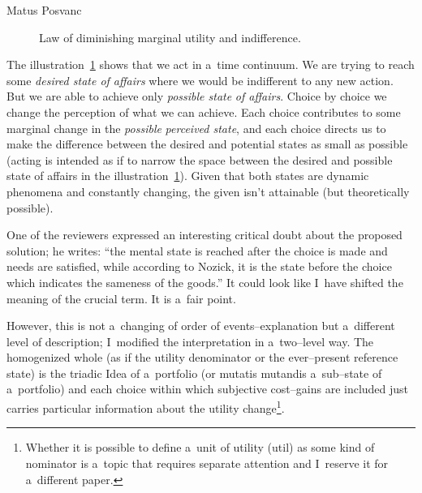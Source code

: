 \begin{artengenv}{Matus Posvanc}
\begin{figure}
 \begin{center}
 \end{center}%
 \caption{Law of diminishing marginal utility and indifference.}\label{pos:fig4}
\end{figure}






The illustration~\ref{pos:fig4} shows that we act in a~time continuum. We are trying to reach some \textit{desired state of affairs} where we would be indifferent to any new action. But we are able to achieve only \textit{possible state} \textit{of affairs}. Choice by choice we change the perception of what we can achieve. Each choice contributes to some marginal change in the \textit{possible} \textit{perceived state}, and each choice directs us to make the difference between the desired and potential states as small as possible (acting is intended as if to narrow the space between the desired and possible state of affairs in the illustration~\ref{pos:fig4}). Given that both states are dynamic phenomena and constantly changing, the given isn't attainable (but theoretically possible).



One of the reviewers expressed an interesting critical doubt about the proposed solution; he writes: ``the mental state is reached after the choice is made and needs are satisfied, while according to Nozick, it is the state before the choice which indicates the sameness of the goods.'' It could look like I~have shifted the meaning of the crucial term. It is a~fair point.



However, this is not a~changing of order of events–explanation but a~different level of description; I~modified the interpretation in a~two–level way. The homogenized whole (as if the utility denominator or the ever–present reference state) is the triadic Idea of a~portfolio (or mutatis mutandis a~sub–state of a~portfolio) and each choice within which subjective cost–gains are included just carries particular information about the utility change\footnote{Whether it is possible to define a~unit of utility (util) as some kind of nominator is a~topic that requires separate attention and I~reserve it for a~different paper. }.




\end{artengenv}
